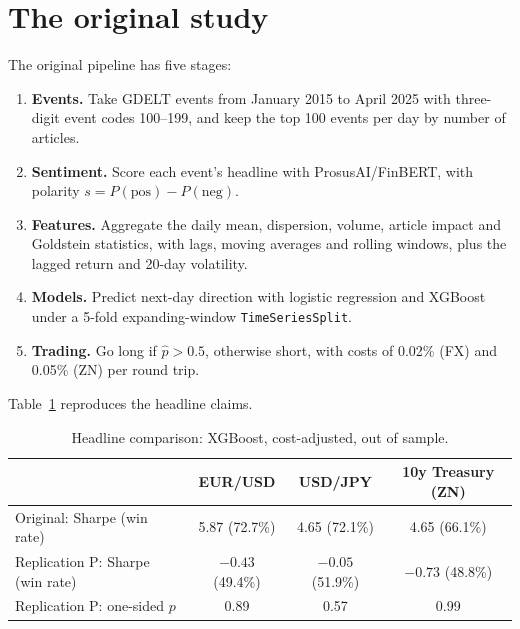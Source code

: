 \documentclass[11pt]{article}
\begin{document}
\section{The original study}
The original pipeline has five stages:
\begin{enumerate}
  \item \textbf{Events.} Take GDELT events from January 2015 to April 2025 with three-digit event codes 100--199,
        and keep the top 100 events per day by number of articles.
  \item \textbf{Sentiment.} Score each event's headline with ProsusAI/FinBERT, with polarity $s=P(\text{pos})-P(\text{neg})$.
  \item \textbf{Features.} Aggregate the daily mean, dispersion, volume, article impact and Goldstein statistics,
        with lags, moving averages and rolling windows, plus the lagged return and 20-day volatility.
  \item \textbf{Models.} Predict next-day direction with logistic regression and XGBoost under a 5-fold
        expanding-window \texttt{TimeSeriesSplit}.
  \item \textbf{Trading.} Go long if $\hat p>0.5$, otherwise short, with costs of 0.02\% (FX) and 0.05\% (ZN) per
        round trip.
\end{enumerate}
Table~\ref{tab:headline} reproduces the headline claims.

\begin{table}[tb]\centering
\caption{Headline comparison: XGBoost, cost-adjusted, out of sample.}\label{tab:headline}
\begin{tabular}{lccc}\toprule
 & EUR/USD & USD/JPY & 10y Treasury (ZN)\\\midrule
Original: Sharpe (win rate) & 5.87 (72.7\%) & 4.65 (72.1\%) & 4.65 (66.1\%)\\
Replication P: Sharpe (win rate) & $-0.43$ (49.4\%) & $-0.05$ (51.9\%) & $-0.73$ (48.8\%)\\
Replication P: one-sided $p$ & 0.89 & 0.57 & 0.99\\\bottomrule
\end{tabular}
\end{table}
\end{document}
